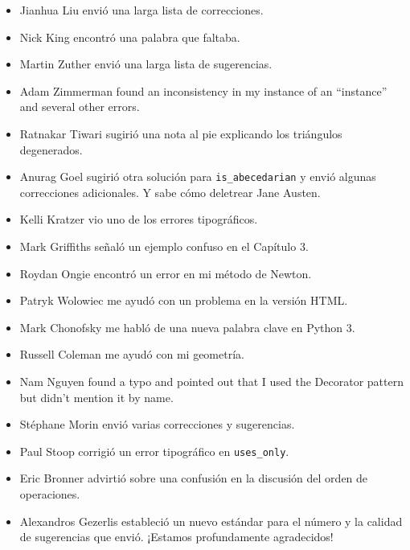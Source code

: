 \documentclass[10pt]{book}
\begin{document}
\begin{itemize}
\item Jianhua Liu envió una larga lista de correcciones.

\item Nick King encontró una palabra que faltaba.

\item Martin Zuther envió una larga lista de sugerencias.

\item Adam Zimmerman found an inconsistency in my instance
of an ``instance'' and several other errors.

\item Ratnakar Tiwari sugirió una nota al pie explicando los triángulos
degenerados.

\item Anurag Goel sugirió otra solución para \verb"is_abecedarian"
y envió algunas correcciones adicionales.  Y sabe cómo
deletrear Jane Austen.

\item Kelli Kratzer vio uno de los errores tipográficos.

\item Mark Griffiths señaló un ejemplo confuso en el Capítulo 3.

\item Roydan Ongie encontró un error en mi método de Newton.

\item Patryk Wolowiec me ayudó con un problema en la versión HTML.

\item Mark Chonofsky me habló de una nueva palabra clave en Python 3.

\item Russell Coleman me ayudó con mi geometría.

\item Nam Nguyen found a typo and pointed out that I used the Decorator
pattern but didn't mention it by name.

\item St\'{e}phane Morin envió varias correcciones y sugerencias.

\item Paul Stoop corrigió un error tipográfico en \verb+uses_only+.

\item Eric Bronner advirtió sobre una confusión en la discusión del
orden de operaciones.

\item Alexandros Gezerlis estableció un nuevo estándar para el número y
la calidad de sugerencias que envió.  ¡Estamos profundamente agradecidos!


\end{itemize}
\end{document}
